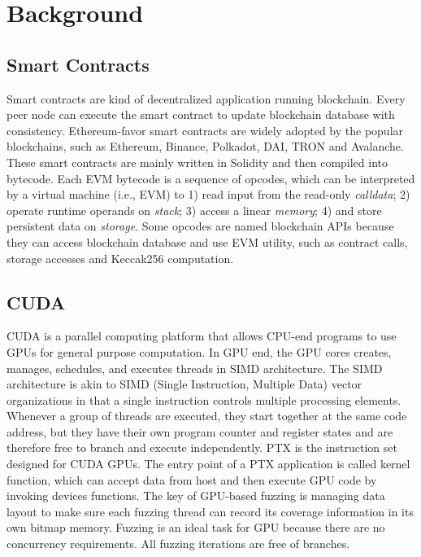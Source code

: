 \section{Background}

\subsection{Smart Contracts}
Smart contracts are kind of decentralized application running blockchain. 
Every peer node can execute the smart contract to update blockchain database with consistency. 
Ethereum-favor smart contracts are widely adopted by the popular blockchains, such as Ethereum\cite{wood2014ethereum}, Binance\cite{binance2021whitepaper}, Polkadot\cite{polkadot2021whitepaper}, DAI\cite{dai2021paper}, TRON\cite{tron2021paper} and Avalanche\cite{avalab2021paper}.
These smart contracts are mainly written in Solidity\cite{solidity} and then compiled into bytecode.
Each EVM bytecode is a sequence of opcodes, which can be interpreted by a virtual machine (i.e., EVM) to 1) read input from the read-only \textit{calldata}; 2) operate runtime operands on \textit{stack}; 3) access a linear \textit{memory}; 4) and store persistent data on \textit{storage}.
Some opcodes are named blockchain APIs because they can access blockchain database and use EVM utility, such as contract calls, storage accesses and Keccak256 computation\cite{bertoni2013keccak}. 

\subsection{CUDA}
CUDA\cite{nvidia2021cuda} is a parallel computing platform that allows CPU-end programs to use GPUs for general purpose computation. 
In GPU end, the GPU cores creates, manages, schedules, and executes threads in SIMD architecture.
The SIMD architecture is akin to SIMD (Single Instruction, Multiple Data) vector organizations in that a single instruction controls multiple processing elements.
Whenever a group of threads are executed, they start together at the same code address, but they have their own program counter and register states and are therefore free to branch and execute independently.
PTX is the instruction set designed for CUDA GPUs.
The entry point of a PTX application is called kernel function, which can accept data from host and then execute GPU code by invoking devices functions. 
%
The key of GPU-based fuzzing is managing data layout to make sure each fuzzing thread can record its coverage information in its own bitmap memory.   
Fuzzing is an ideal task for GPU because there are no concurrency requirements. All fuzzing iterations are free of branches.